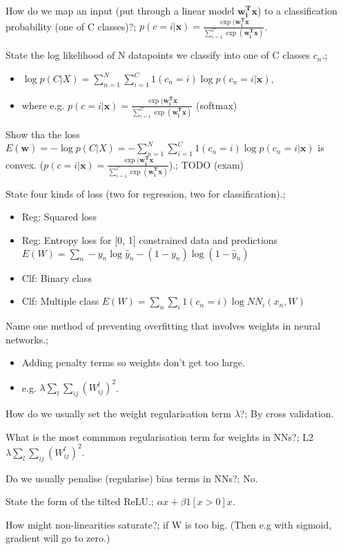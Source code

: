 \documentclass{article}
\begin{document}
How do we map an input (put through a linear model $\bm{w^T_ix}$) to a classification  probability (one of C classes)?; $p(c = i|\bm{x}) = \frac{\exp (\bm{w_i^Tx}}{\sum_{i=1}^C\exp(\bm{w^T_i x})}$.

State the log likelihood of N datapoints we classify into one of C classes $c_n$.; \begin{itemize} \item $\log p(C|X) = \sum_{n=1}^N \sum_{i=1}^C 1(c_n = i)\log  p(c_n = i|\bm{x})$,  \item where e.g. $p(c = i|\bm{x}) = \frac{\exp (\bm{w_i^Tx}}{\sum_{i=1}^C\exp(\bm{w^T_i x})}$ (softmax) \end{itemize}

Show tha the loss $E(\bm{w}) = -\log p(C|X) =- \sum_{n=1}^N \sum_{i=1}^C 1(c_n = i)\log p(c_n = i|\bm{x})$ is convex. ($p(c = i|\bm{x}) = \frac{\exp (\bm{w_i^Tx}}{\sum_{i=1}^C\exp(\bm{w^T_i x})}$).; TODO (exam)

State four kinds of loss (two for regression, two for classification).; \begin{itemize} \item Reg: Squared loss \item Reg: Entropy loss for [0, 1] constrained data and predictions $E(W) = \sum_n -y_n\log \hat{y}_n - (1-y_n)\log (1-\hat{y}_n)$ \item Clf: Binary class \item Clf: Multiple class $E(W) = \sum_n\sum_i 1(c_n = i)\log NN_i(x_n, W)$ \end{itemize}

Name one method of preventing overfitting that involves weights in neural networks.; \begin{itemize} \item Adding penalty terms so weights don't get too large. \item e.g. $\lambda \sum_l \sum_{ij}(W^l_{ij})^2$. \end{itemize}

How do we usually set the weight regularisation term $\lambda$?; By cross validation.

What is the most commmon regularisation term for weights in NNs?; L2 $\lambda\sum_l\sum_{ij}(W^l_{ij})^2$.

Do we usually penalise (regularise) bias terms in NNs?; No.

State the form of the tilted ReLU.; $\alpha x + \beta 1[x > 0] x$.

How might non-linearities saturate?; if W is too big. (Then e.g with sigmoid, gradient will go to zero.)
\end{document}
